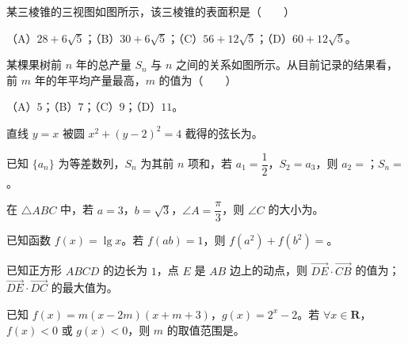 \begin{question}
某三棱锥的三视图如图所示，该三棱锥的表面积是\mbox{（　　）}
\nopagebreak[4]
\begin{center}\end{center}
\nopagebreak[4]
（A）$28+6\sqrt5$；（B）$30+6\sqrt5$；（C）$56+12\sqrt5$；（D）$60+12\sqrt5$。

\Needspace{0.4\textheight}
\end{question}
\begin{question}
某棵果树前 $n$ 年的总产量 $S_n$ 与 $n$ 之间的关系如图所示。从目前记录的结果看，前 $m$ 年的年平均产量最高，$m$ 的值为\mbox{（　　）}
\nopagebreak[4]
\begin{center}\end{center}
\nopagebreak[4]
（A）$5$；（B）$7$；（C）$9$；（D）$11$。

\end{question}

\begin{question}
直线 $y=x$ 被圆 $x^2+(y-2)^2=4$ 截得的弦长为\gkblank{}。

\end{question}
\begin{question}
已知 $\{a_n\}$ 为等差数列，$S_n$ 为其前 $n$ 项和，若 $a_1=\dfrac12$，$S_2=a_3$，则 $a_2=$\gkblank{}；$S_n=$\gkblank{}。

\end{question}
\begin{question}
在 $\triangle ABC$ 中，若 $a=3$，$b=\sqrt3$，$\angle A=\dfrac\pi3$，则 $\angle C$ 的大小为\gkblank{}。

\end{question}
\begin{question}
已知函数 $f(x)=\lg x$。若 $f(ab)=1$，则 $f(a^2)+f(b^2)=$\gkblank{}。

\end{question}
\begin{question}
已知正方形 $ABCD$ 的边长为 $1$，点 $E$ 是 $AB$ 边上的动点，则 $\overrightarrow{DE}\cdot\overrightarrow{CB}$ 的值为\gkblank{}；$\overrightarrow{DE}\cdot\overrightarrow{DC}$ 的最大值为\gkblank{}。

\end{question}
\begin{question}
已知 $f(x)=m(x-2m)(x+m+3)$，$g(x)=2^x-2$。若 $\forall x\in\mathbf R$，$f(x)<0$ 或 $g(x)<0$，则 $m$ 的取值范围是\gkblank{}。

\end{question}

